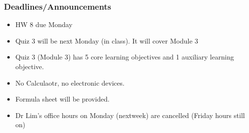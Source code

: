 
\begin{frame}
    \frametitle{Deadlines/Announcements}
\begin{itemize}
            \item HW 8 due Monday
            \item Quiz 3 will be next Monday (in class). It will cover Module 3
            \item Quiz 3 (Module 3) has 5 core learning objectives and 1 auxiliary learning objective. 
            \item No Calculaotr, no electronic devices. 
            \item Formula sheet will be provided.
            \item Dr Lim's office hours on Monday (nextweek) are cancelled (Friday hours still on)
        \end{itemize}
\end{frame}

